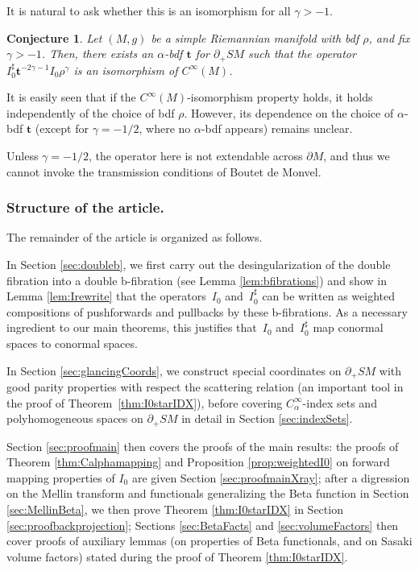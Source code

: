 \documentclass[JEP,XML,SOM,Unicode,NoFloatCountersInSection, NoEqCountersInSection,published]{cedram}
\theoremstyle{plain}
\newtheorem{Conjecture}[Theorem]{Conjecture}
\theoremstyle{definition}
\theoremstyle{remark}
\newcommand{\bt}{{\boldsymbol{t}}}
\newcommand{\adj}{I_0^\sharp}
\newcommand{\del}{\partial}
\begin{document}
It is natural to ask whether this is an isomorphism for all $\gamma>-1$.
\begin{Conjecture} \label{conj}
Let $(M,g)$ be a simple Riemannian manifold with bdf $\rho$, and fix $\gamma>-1$. Then, there exists an $\alpha$-bdf $\bt$ for $\partial_+ SM$ such that the operator $\adj \bt^{-2\gamma-1} I_0 \rho^\gamma$ is an isomorphism of $C^\infty(M)$.
\end{Conjecture}

It is easily seen that if the $C^\infty(M)$-isomorphism property holds, it holds independently of the choice of bdf $\rho$. However, its dependence on the choice of $\alpha$-bdf $\bt$ (except for $\gamma=-1/2$, where no $\alpha$-bdf appears) remains unclear.

Unless $\gamma= -1/2$, the operator here is not extendable across $\del M$, and thus we cannot invoke the transmission conditions of Boutet de Monvel.

\subsubsection*{Structure of the article.} The remainder of the article is organized as follows.

In Section \ref{sec:doubleb}, we first carry out the desingularization of the double fibration into a double b-fibration (see Lemma \ref{lem:bfibrations}) and show in Lemma \ref{lem:Irewrite} that the operators~$I_0$ and~$I_0^\sharp$ can be written as weighted compositions of pushforwards and pullbacks by these b-fibrations. As a necessary ingredient to our main theorems, this justifies that~$I_0$ and~$I_0^\sharp$ map conormal spaces to conormal spaces.

In Section \ref{sec:glancingCoords}, we construct special coordinates on $\partial_+ SM$ with good parity properties with respect the scattering relation (an important tool in the proof of Theorem~\ref{thm:I0starIDX}), before covering $C_\alpha^\infty$-index sets and polyhomogeneous spaces on $\partial_+ SM$ in detail in Section \ref{sec:indexSets}.

Section \ref{sec:proofmain} then covers the proofs of the main results: the proofs of Theorem \ref{thm:Calphamapping} and Proposition \ref{prop:weightedI0} on forward mapping properties of $I_0$ are given Section \ref{sec:proofmainXray}; after a digression on the Mellin transform and functionals generalizing the Beta function in Section \ref{sec:MellinBeta}, we then prove Theorem \ref{thm:I0starIDX} in Section \ref{sec:proofbackprojection}; Sections \ref{sec:BetaFacts} and \ref{sec:volumeFactors} then cover proofs of auxiliary lemmas (on properties of Beta functionals, and on Sasaki volume factors) stated during the proof of Theorem \ref{thm:I0starIDX}.
\end{document}
